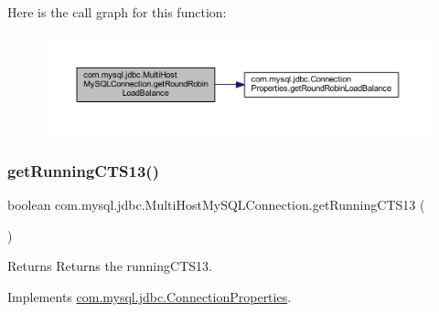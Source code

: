 Here is the call graph for this function\+:
\nopagebreak
\begin{figure}[H]
\begin{center}
\leavevmode
\includegraphics[width=350pt]{classcom_1_1mysql_1_1jdbc_1_1_multi_host_my_s_q_l_connection_a262fd54d367adf5972243b82981778ad_cgraph}
\end{center}
\end{figure}
\mbox{\label{classcom_1_1mysql_1_1jdbc_1_1_multi_host_my_s_q_l_connection_a560585155115e4a2a82356fffe5fc672}} 
\subsubsection{\texorpdfstring{get\+Running\+C\+T\+S13()}{getRunningCTS13()}}
{\footnotesize\ttfamily boolean com.\+mysql.\+jdbc.\+Multi\+Host\+My\+S\+Q\+L\+Connection.\+get\+Running\+C\+T\+S13 (\begin{DoxyParamCaption}{ }\end{DoxyParamCaption})}

\begin{DoxyReturn}{Returns}
Returns the running\+C\+T\+S13. 
\end{DoxyReturn}


Implements \mbox{\hyperlink{interfacecom_1_1mysql_1_1jdbc_1_1_connection_properties_ac861d675728756c06dd2984057b95ab6}{com.\+mysql.\+jdbc.\+Connection\+Properties}}.

